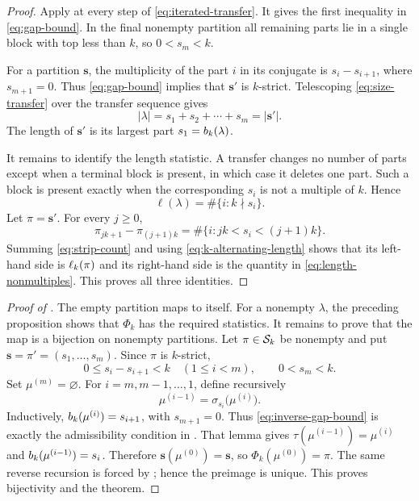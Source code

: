 \begin{proof}
Apply  at every step of
\eqref{eq:iterated-transfer}. It gives the first inequality in
\eqref{eq:gap-bound}. In the final nonempty partition all remaining parts lie
in a single block with top less than $k$, so $0<s_m<k$.

For a partition $\mathbf{s}$, the multiplicity of the part $i$ in its
conjugate is $s_i-s_{i+1}$, where $s_{m+1}=0$. Thus
\eqref{eq:gap-bound} implies that $\mathbf{s}'$ is $k$-strict. Telescoping
\eqref{eq:size-transfer} over the transfer sequence gives
\begin{equation}\label{eq:size-telescope}
 |\lambda|=s_1+s_2+\cdots+s_m=|\mathbf{s}'|.
\end{equation}
The length of $\mathbf{s}'$ is its largest part $s_1=b_k(\lambda)$.

It remains to identify the length statistic. A transfer changes no number of
parts except when a terminal block is present, in which case it deletes one
part. Such a block is present exactly when the corresponding $s_i$ is not a
multiple of $k$. Hence
\begin{equation}\label{eq:length-nonmultiples}
 \ell(\lambda)=\#\{i: k\nmid s_i\}.
\end{equation}
Let $\pi=\mathbf{s}'$. For every $j\geq0$,
\begin{equation}\label{eq:strip-count}
 \pi_{jk+1}-\pi_{(j+1)k}
 =\#\{i: jk<s_i<(j+1)k\}.
\end{equation}
Summing \eqref{eq:strip-count} and using \eqref{eq:k-alternating-length}
shows that its left-hand side is $\ell_k(\pi)$ and its right-hand side is the
quantity in \eqref{eq:length-nonmultiples}. This proves all three identities.
\end{proof}

\begin{proof}[Proof of ]
The empty partition maps to itself. For a nonempty $\lambda$, the preceding
proposition shows that $\Phi_k$ has the required statistics. It remains to
prove that the map is a bijection on nonempty partitions. Let $\pi\in\mathcal{S}_k$ be
nonempty and put
$\mathbf{s}=\pi'=(s_1,\ldots,s_m)$. Since $\pi$ is $k$-strict,
\begin{equation}\label{eq:inverse-gap-bound}
 0\leq s_i-s_{i+1}<k\quad(1\leq i<m),
 \qquad 0<s_m<k.
\end{equation}
Set $\mu^{(m)}=\varnothing$. For $i=m,m-1,\ldots,1$, define recursively
\begin{equation}\label{eq:inverse-recursion}
 \mu^{(i-1)}=\sigma_{s_i}\bigl(\mu^{(i)}\bigr).
\end{equation}
Inductively, $b_k(\mu^{(i)})=s_{i+1}$, with $s_{m+1}=0$. Thus
\eqref{eq:inverse-gap-bound} is exactly the admissibility condition in
. That lemma gives
$\tau(\mu^{(i-1)})=\mu^{(i)}$ and
$b_k(\mu^{(i-1)})=s_i$. Therefore
$\mathbf{s}(\mu^{(0)})=\mathbf{s}$, so $\Phi_k(\mu^{(0)})=\pi$. The same
reverse recursion is forced by ; hence the
preimage is unique. This proves bijectivity and the theorem.
\end{proof}
